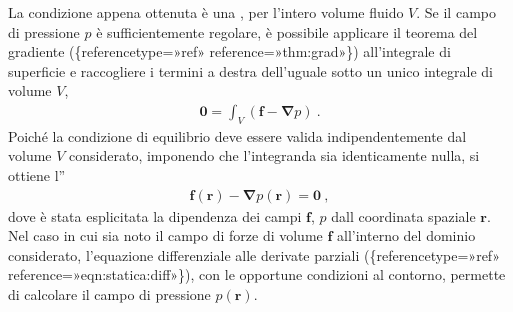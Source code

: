 \documentclass[letterpaper,10pt,italian]{jupyterBook}
\begin{document}
La condizione appena ottenuta è una , per l’intero volume fluido \(V\). Se il campo di pressione
\(p\) è sufficientemente regolare, è possibile applicare il teorema del
gradiente (\{reference\sphinxhyphen{}type=»ref»
reference=»thm:grad»\}) all’integrale di superficie e raccogliere i
termini a destra dell’uguale sotto un unico integrale di volume \(V\),
\begin{equation*}
\begin{split}\mathbf{0} = \int_V \left( \mathbf{f} - \mathbf{\nabla} p \right) \ .\end{split}
\end{equation*}
\sphinxAtStartPar
Poiché la
condizione di equilibrio deve essere valida indipendentemente dal volume
\(V\) considerato, imponendo che l’integranda sia identicamente nulla, si
ottiene l”
\begin{equation*}
\begin{split}\label{eqn:statica:diff}
 \mathbf{f}(\mathbf{r}) - \mathbf{\nabla} p (\mathbf{r}) = \mathbf{0} \ ,\end{split}
\end{equation*}
\sphinxAtStartPar
dove è stata
esplicitata la dipendenza dei campi \(\mathbf{f}\), \(p\) dall coordinata
spaziale \(\mathbf{r}\). Nel caso in cui sia noto il campo di forze di volume
\(\mathbf{f}\) all’interno del dominio considerato, l’equazione differenziale
alle derivate parziali
(\{reference\sphinxhyphen{}type=»ref»
reference=»eqn:statica:diff»\}), con le opportune condizioni al contorno,
permette di calcolare il campo di pressione \(p(\mathbf{r})\).
\end{document}
